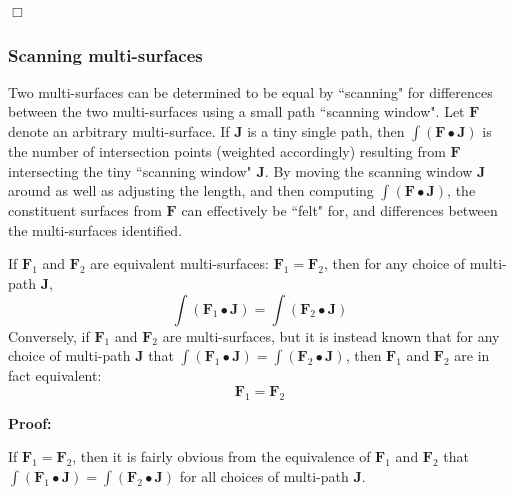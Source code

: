 \(\Box\)

\subsubsection{Scanning multi-surfaces}

Two multi-surfaces can be determined to be equal by ``scanning" for differences between the two multi-surfaces using a small path ``scanning window". Let \(\mathbf{F}\) denote an arbitrary multi-surface. If \(\mathbf{J}\) is a tiny single path, then \(\int (\mathbf{F} \bullet \mathbf{J})\) is the number of intersection points (weighted accordingly) resulting from \(\mathbf{F}\) intersecting the tiny ``scanning window" \(\mathbf{J}\). By moving the scanning window \(\mathbf{J}\) around as well as adjusting the length, and then computing \(\int (\mathbf{F} \bullet \mathbf{J})\), the constituent surfaces from \(\mathbf{F}\) can effectively be ``felt" for, and differences between the multi-surfaces identified.  

\begin{thm}
If \(\mathbf{F}_1\) and \(\mathbf{F}_2\) are equivalent multi-surfaces: \(\mathbf{F}_1 = \mathbf{F}_2\), then for any choice of multi-path \(\mathbf{J}\), 
\[\int (\mathbf{F}_1 \bullet \mathbf{J}) = \int (\mathbf{F}_2 \bullet \mathbf{J})\]
Conversely, if \(\mathbf{F}_1\) and \(\mathbf{F}_2\) are multi-surfaces, but it is instead known that for any choice of multi-path \(\mathbf{J}\) that 
\(\int (\mathbf{F}_1 \bullet \mathbf{J}) = \int (\mathbf{F}_2 \bullet \mathbf{J})\), then \(\mathbf{F}_1\) and \(\mathbf{F}_2\) are in fact equivalent:
\[\mathbf{F}_1 = \mathbf{F}_2\]  
\end{thm}
\textbf{Proof:}

If \(\mathbf{F}_1 = \mathbf{F}_2\), then it is fairly obvious from the equivalence of \(\mathbf{F}_1\) and \(\mathbf{F}_2\) that \(\int (\mathbf{F}_1 \bullet \mathbf{J}) = \int (\mathbf{F}_2  \bullet \mathbf{J})\) for all choices of multi-path \(\mathbf{J}\). 

\vspace{5mm}

